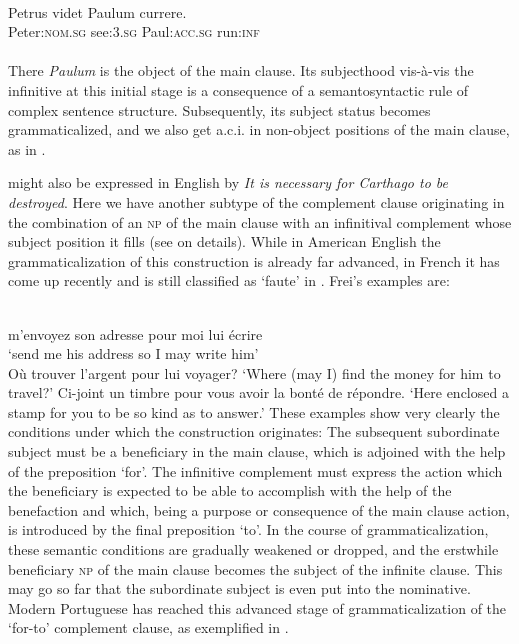 \ea\label{ex:E33}
\\
\gll Petrus  videt  Paulum  currere.\\
 Peter:\textsc{nom}.\textsc{sg}  see:3.\textsc{sg}  Paul:\textsc{acc}.\textsc{sg}  run:\textsc{inf}\\
\\
\z
\noindent {}
\noindent There \textit{Paulum} is the object of the main clause. Its subjecthood vis-à-vis the infinitive at this initial stage is a consequence of a semantosyntactic rule of complex sentence structure. Subsequently, its subject status becomes grammaticalized, and we also get a.c.i. in non-object positions of the main clause, as in .

 might also be expressed in English by \textit{It is necessary for Carthago to be destroyed}. Here we have another subtype of the complement clause originating in the combination of an \textsc{np} of the main clause with an infinitival complement whose subject position it fills (see \citealt[300--306]{Jespersen1940} on details). While in American English the grammaticalization of this construction is already far advanced, in French it has come up recently and is still classified as ‘faute’ in \citealt[94]{Frei1929}. Frei's examples are:

\ea\label{ex:E35}
\langinfo{\LangFren}{}{} \\
\ea
  m'envoyez son adresse pour moi lui écrire\\
\glt ‘send me his address so I may write him’\\
\ex Où trouver l'argent pour lui voyager?
\glt ‘Where (may I) find the money for him to travel?’
\ex Ci-joint un timbre pour vous avoir la bonté de répondre.
\glt ‘Here enclosed a stamp for you to be so kind as to answer.’
\z
\z
\noindent These examples show very clearly the conditions under which the construction originates: The subsequent subordinate subject must be a beneficiary in the main clause, which is adjoined with the help of the preposition ‘for’. The infinitive complement must express the action which the beneficiary is expected to be able to accomplish with the help of the benefaction and which, being a purpose or consequence of the main clause action, is introduced by the final preposition ‘to’. In the course of grammaticalization, these semantic conditions are gradually weakened or dropped, and the erstwhile beneficiary \textsc{np} of the main clause becomes the subject of the infinite clause. This may go so far that the subordinate subject is even put into the nominative.\label{page72} Modern Portuguese has reached this advanced stage of grammaticalization of the ‘for-to’ complement clause, as exemplified in .

